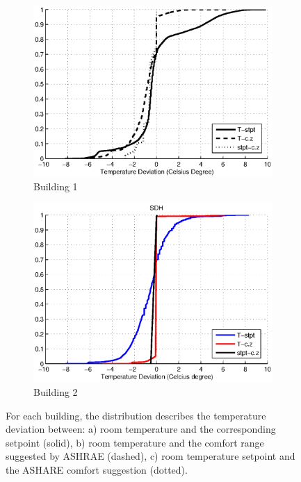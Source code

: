 \begin{figure}[ht!]
\centering
	\begin{subfigure}{0.48\textwidth}
                \centering
		\includegraphics[width=\textwidth]{./figs/Soda_new.eps}
                \caption{Building 1}
	\end{subfigure}
	\begin{subfigure}{0.48\textwidth}
                \centering
		\includegraphics[width=\textwidth]{./figs/SDH_new.eps}
                \caption{Building 2}
	\end{subfigure}
\caption{For each building, the distribution describes the temperature deviation between: a) room temperature and the corresponding setpoint (solid), b) room temperature and the comfort range suggested by ASHRAE (dashed), c) room temperature setpoint and the ASHARE comfort suggestion (dotted).}
\label{fig:cdf_temp}
\end{figure}

